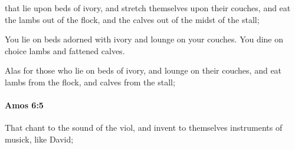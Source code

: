 			\begin{versebox}
					\item[BHS] 
					\item[LXX] 
					\item[ASV] that lie upon beds of ivory, and stretch themselves upon their couches, and eat the lambs out of the flock, and the calves out of the midst of the stall;
					\item[NIV] You lie on beds adorned with ivory and lounge on your couches. You dine on choice lambs and fattened calves.
					\item[NRSV] Alas for those who lie on beds of ivory, and lounge on their couches, and eat lambs from the flock, and calves from the stall;
			\end{versebox}

		\paragraph{Amos 6:5} %
			\label{AMOS-6-5}

			That chant to the sound of the viol, and invent to themselves instruments of musick, like David;

